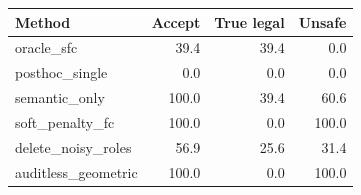 \begin{tabular}{lrrr}
\toprule
Method & Accept & True legal & Unsafe \\
\midrule
oracle\_sfc & 39.4 & 39.4 & 0.0 \\
posthoc\_single & 0.0 & 0.0 & 0.0 \\
semantic\_only & 100.0 & 39.4 & 60.6 \\
soft\_penalty\_fc & 100.0 & 0.0 & 100.0 \\
delete\_noisy\_roles & 56.9 & 25.6 & 31.4 \\
auditless\_geometric & 100.0 & 0.0 & 100.0 \\
\bottomrule
\end{tabular}
